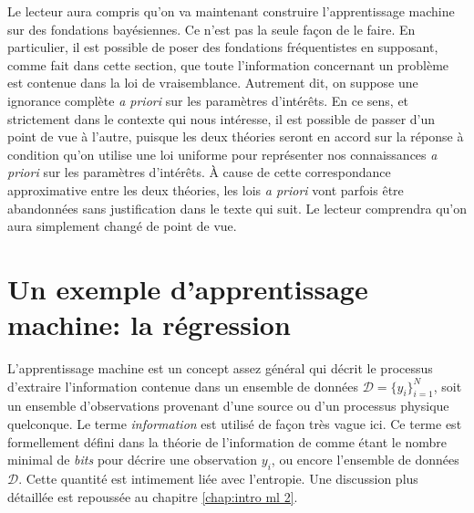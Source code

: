 Le lecteur aura compris qu'on va maintenant construire l'apprentissage machine sur des fondations bayésiennes. Ce n'est pas la seule façon de le 
faire. En particulier, il est possible de poser des fondations fréquentistes en supposant, comme fait dans cette section, que toute l'information 
concernant un problème est contenue dans la loi de vraisemblance. Autrement dit, on suppose une ignorance complète \textit{a priori} sur les paramètres d'intérêts. 
En ce sens, et strictement dans le contexte qui nous intéresse, il est possible de passer d'un point de vue à l'autre, puisque les deux théories seront en accord 
sur la réponse à condition qu'on utilise une loi uniforme pour représenter nos connaissances \textit{a priori} sur les paramètres d'intérêts. 
À cause de cette correspondance approximative entre les deux théories, les lois 
\textit{a priori} vont parfois être abandonnées sans justification dans le texte qui suit. 
Le lecteur comprendra qu'on aura simplement changé de point de vue. 

\section{Un exemple d'apprentissage machine: la régression}\label{sec:app classique}

L'apprentissage machine est un concept assez général qui décrit le processus d'extraire l'information contenue 
dans un ensemble de données $\mathcal{D} = \{y_i\}_{i=1}^{N}$, soit un ensemble d'observations provenant d'une source ou d'un processus 
physique quelconque. Le terme \textit{information} est utilisé de façon très vague ici. Ce terme est formellement défini dans la théorie 
de l'information de \citet{Shannon1948} comme étant le nombre minimal de \textit{bits} pour décrire une observation $y_i$, ou encore 
l'ensemble de données $\mathcal{D}$. Cette quantité est intimement liée avec l'entropie. Une discussion plus détaillée est 
repoussée au chapitre \ref{chap:intro ml 2}.

